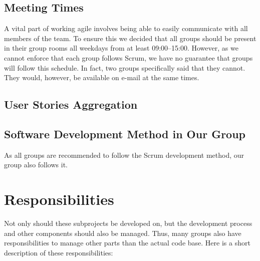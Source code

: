 \subsection{Meeting Times}
A vital part of working agile involves being able to easily communicate with all members of the team. To ensure this we decided that all groups should be present in their group rooms all weekdays from at least 09:00--15:00. However, as we cannot enforce that each group follows Scrum, we have no guarantee that groups will follow this schedule. In fact, two groups specifically said that they cannot. They would, however, be available on e-mail at the same times.

\subsection{User Stories Aggregation}

\subsection{Software Development Method in Our Group}
As all groups are recommended to follow the Scrum development method, our group also follows it. 


\section{Responsibilities}\label{sec:responsibilities}
Not only should these subprojects be developed on, but the development process and other components should also be managed. Thus, many groups also have responsibilities to manage other parts than the actual code base. Here is a short description of these responsibilities:

